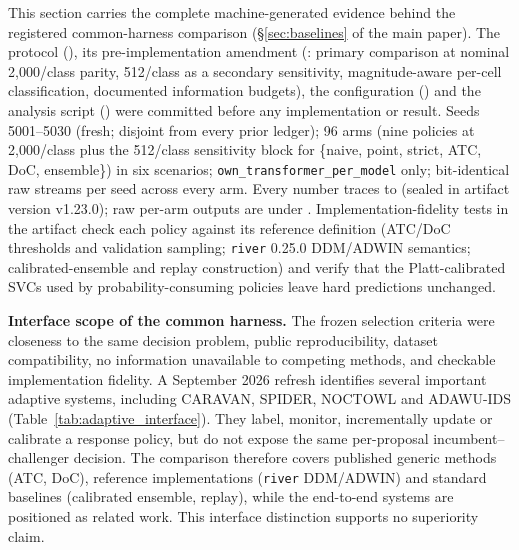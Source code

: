 \documentclass[a4paper,11pt]{article}
\begin{document}
This section carries the complete machine-generated evidence behind the registered
common-harness comparison (\S\ref{sec:baselines} of the main paper). The protocol
(), its pre-implementation
amendment (: primary
comparison at nominal 2{,}000/class parity, 512/class as a secondary sensitivity,
magnitude-aware per-cell classification, documented information budgets), the
configuration () and the analysis
script () were committed before any
implementation or result. Seeds 5001--5030 (fresh; disjoint from every prior ledger); 96
arms (nine policies at 2{,}000/class plus the 512/class sensitivity block for \{naive,
point, strict, ATC, DoC, ensemble\}) in six scenarios; \texttt{own\_transformer\_per\_model}
only; bit-identical raw streams per seed across every arm. Every number traces to
 (sealed in artifact version v1.23.0); raw per-arm
outputs are under . Implementation-fidelity tests in the artifact
check each policy against its reference definition (ATC/DoC thresholds and validation
sampling; \texttt{river} 0.25.0 DDM/ADWIN semantics; calibrated-ensemble and replay
construction) and verify that the Platt-calibrated SVCs used by probability-consuming
policies leave hard predictions unchanged.

\textbf{Interface scope of the common harness.} The frozen selection criteria were
closeness to the same decision problem, public reproducibility, dataset compatibility,
no information unavailable to competing methods, and checkable implementation fidelity.
A September 2026 refresh identifies several important adaptive systems, including CARAVAN,
SPIDER, NOCTOWL and ADAWU-IDS (Table~\ref{tab:adaptive_interface}). They label, monitor,
incrementally update or calibrate a response policy, but do not expose the same per-proposal
incumbent--challenger decision. The comparison therefore covers published generic methods
(ATC, DoC), reference implementations (\texttt{river} DDM/ADWIN) and standard baselines
(calibrated ensemble, replay), while the end-to-end systems are positioned as related work.
This interface distinction supports no superiority claim.
\end{document}
